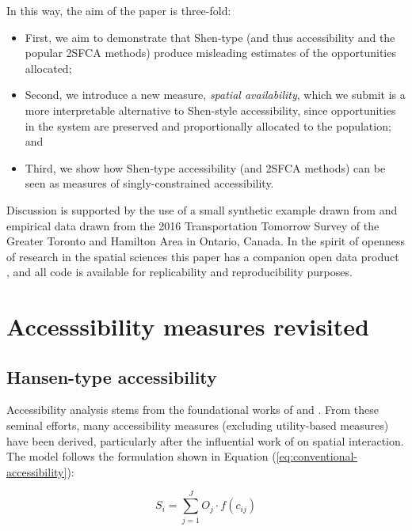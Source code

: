 \documentclass[]{elsarticle} %
\begin{document}
In this way, the aim of the paper is three-fold:

\begin{itemize}
\item
  First, we aim to demonstrate that Shen-type (and thus
  \citet{weibull_axiomatic_1976} accessibility and the popular 2SFCA
  methods) produce misleading estimates of the opportunities allocated;
\item
  Second, we introduce a new measure, \emph{spatial availability}, which
  we submit is a more interpretable alternative to Shen-style
  accessibility, since opportunities in the system are preserved and
  proportionally allocated to the population; and
\item
  Third, we show how Shen-type accessibility (and 2SFCA methods) can be
  seen as measures of singly-constrained accessibility.
\end{itemize}

Discussion is supported by the use of a small synthetic example drawn
from \citet{shen1998} and empirical data drawn from the 2016
Transportation Tomorrow Survey of the Greater Toronto and Hamilton Area
in Ontario, Canada. In the spirit of openness of research in the spatial
sciences \citep{brunsdon2021opening, paez2021open} this paper has a
companion open data product \citep{arribas2021Open}, and all code is
available for replicability and reproducibility purposes.

\hypertarget{background}{%
\section{Accesssibility measures revisited}\label{background}}

\hypertarget{hansen-type-accessibility}{%
\subsection{Hansen-type accessibility}\label{hansen-type-accessibility}}

Accessibility analysis stems from the foundational works of
\citet{harris_market_1954} and \citet{hansen1959}. From these seminal
efforts, many accessibility measures (excluding utility-based measures)
have been derived, particularly after the influential work of
\citet{wilson1971} on spatial interaction. The model follows the
formulation shown in Equation (\ref{eq:conventional-accessibility}):

\begin{equation}
\label{eq:conventional-accessibility}
S_i = \sum_{j=1}^JO_j \cdot f(c_{ij})
\end{equation}
\end{document}
